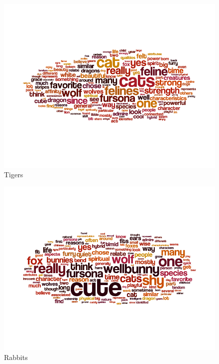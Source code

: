 \begin{figure}
  \begin{center}
    \includegraphics[width=\textwidth]{content/assets/species-2--tiger}
  \end{center}
  \caption{Tigers}
\end{figure}

\begin{figure}
  \begin{center}
    \includegraphics[width=\textwidth]{content/assets/species-2--rabbit}
  \end{center}
  \caption{Rabbits}
\end{figure}

